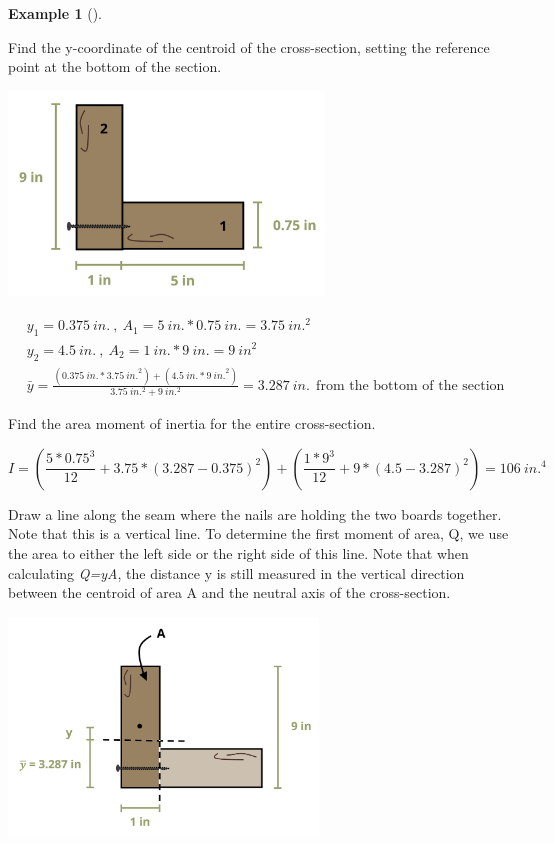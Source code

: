 \documentclass[
  letterpaper,
  DIV=11,
  numbers=noendperiod]{scrreprt}
\theoremstyle{definition}
\newtheorem{example}{Example}[chapter]
\theoremstyle{remark}
\begin{document}
\begin{tcolorbox}
\begin{example}[]
\begin{tcolorbox}
Find the y-coordinate of the centroid of the cross-section, setting the
reference point at the bottom of the section.

\begin{center}
\includegraphics[width=3.30208in,height=\textheight]{images/CH10 PNGs/example 10.6 part 2.png}
\end{center}

\[
\begin{aligned}
& y_1=0.375{~in.}~,~ A_1=5{~in.} * 0.75{~in.}=3.75{~in.}^2 \\
& y_2=4.5{~in.}~,~ A_2=1{~in.} * 9{~in.}=9{~in}^2 \\
& \bar{y}=\frac{(0.375{~in.} * 3.75{~in.}^2)+(4.5{~in.} * 9{~in.}^2)}{3.75{~in.^2}+9{~in.^2}} = 3.287{~in.}~~\text{from the bottom of the section}
\end{aligned}
\]

Find the area moment of inertia for the entire cross-section.

\[
I=\left(\frac{5 * 0.75^3}{12}+3.75 *(3.287-0.375)^2\right)+\left(\frac{1 * 9^3}{12}+9 *(4.5-3.287)^2\right)=106{~in.}^4
\]

Draw a line along the seam where the nails are holding the two boards
together. Note that this is a vertical line. To determine the first
moment of area, Q, we use the area to either the left side or the right
side of this line. Note that when calculating \emph{Q=yA}, the distance
y is still measured in the vertical direction between the centroid of
area A and the neutral axis of the cross-section.

\begin{center}
\includegraphics[width=3.23958in,height=\textheight]{images/CH10 PNGs/example 10.6 part 3.png}
\end{center}


\end{tcolorbox}
\end{example}
\end{tcolorbox}
\end{document}
